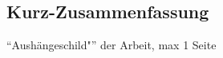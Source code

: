 \begin{spacing}{1.2}

\chapter*{Kurz-Zusammenfassung}

\enquote{Aushängeschild"} der Arbeit, max 1 Seite

\end{spacing}